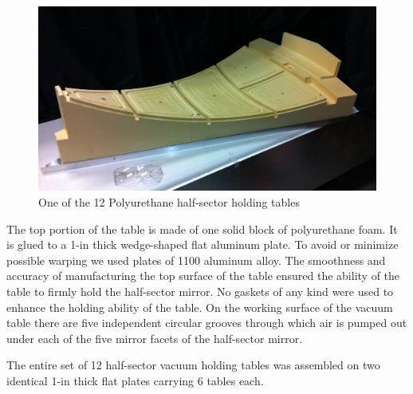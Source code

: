\begin{figure}[ht]
    \centering
    \includegraphics[width=1.0\linewidth]{images/One_Foam_Vacuum_Table.jpg}
    \caption{One of the 12 Polyurethane half-sector holding tables}
    \label{fig:One_Foam_Vacuum_Table}
\end{figure}
 
The top portion of the table is made of one solid block of polyurethane foam. It is glued to a 1-in thick wedge-shaped flat aluminum plate. To avoid or minimize possible warping we used plates of 1100 aluminum alloy. The smoothness and accuracy of manufacturing the top surface of the table ensured the ability of the table to firmly hold the half-sector mirror. No gaskets of any kind were used to enhance the holding ability of the table. On the working surface of the vacuum table there are five independent circular grooves through which air is pumped out under each of the five mirror facets of the half-sector mirror.

The entire set of 12 half-sector vacuum holding tables was assembled on two identical 1-in thick flat plates carrying 6 tables each. 

